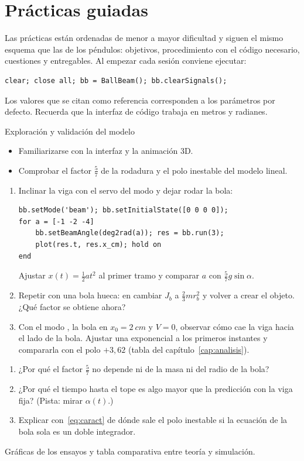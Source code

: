 \chapter{Prácticas guiadas}
\label{cap:practicas}

Las prácticas están ordenadas de menor a mayor dificultad y siguen el mismo esquema que las de los péndulos: objetivos, procedimiento con el código necesario, cuestiones y entregables. Al empezar cada sesión conviene ejecutar:
\begin{lstlisting}
clear; close all; bb = BallBeam(); bb.clearSignals();
\end{lstlisting}
Los valores que se citan como referencia corresponden a los parámetros por defecto. Recuerda que la interfaz de código trabaja en metros y radianes.

\label{pr:explora}
\begin{practica}{Exploración y validación del modelo}
\objetivos
\begin{itemize}
  \item Familiarizarse con la interfaz y la animación 3D.
  \item Comprobar el factor $\tfrac57$ de la rodadura y el polo inestable del modelo lineal.
\end{itemize}
\procedimiento
\begin{enumerate}
  \item Inclinar la viga con el servo del modo  y dejar rodar la bola:
\begin{lstlisting}
bb.setMode('beam'); bb.setInitialState([0 0 0 0]);
for a = [-1 -2 -4]
    bb.setBeamAngle(deg2rad(a)); res = bb.run(3);
    plot(res.t, res.x_cm); hold on
end
\end{lstlisting}
  Ajustar $x(t)=\tfrac12at^2$ al primer tramo y comparar $a$ con $\tfrac57g\sin\alpha$.
  \item Repetir con una bola hueca: en  cambiar $J_b$ a $\tfrac23mr_b^2$ y volver a crear el objeto. ¿Qué factor se obtiene ahora?
  \item Con el modo , la bola en $x_0=\SI{2}{cm}$ y $V=0$, observar cómo cae la viga hacia el lado de la bola. Ajustar una exponencial a los primeros instantes y compararla con el polo $+3{,}62$ (tabla del capítulo~\ref{cap:analisis}).
\end{enumerate}
\preguntas
\begin{enumerate}
  \item ¿Por qué el factor $\tfrac57$ no depende ni de la masa ni del radio de la bola?
  \item ¿Por qué el tiempo hasta el tope es algo mayor que la predicción con la viga fija? (Pista: mirar $\alpha(t)$.)
  \item Explicar con~\eqref{eq:caract} de dónde sale el polo inestable si la ecuación de la bola sola es un doble integrador.
\end{enumerate}
\entregables Gráficas de los ensayos y tabla comparativa entre teoría y simulación.
\end{practica}


